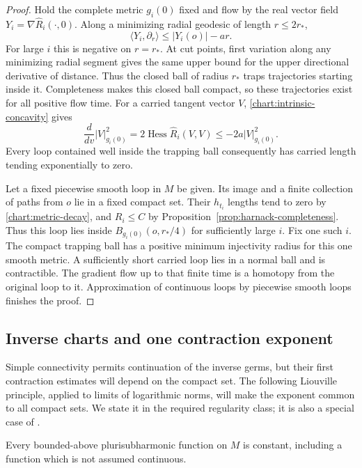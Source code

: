 \begin{proof}
Hold the complete metric $g_i(0)$ fixed and flow by the real
vector field $Y_i=\nabla\widehat R_i(\cdot,0)$.  Along a
minimizing radial geodesic of length $r\le2r_*$,
\[
 \langle Y_i,\partial_r\rangle
 \le |Y_i(o)|-ar.
\]
For large $i$ this is negative on $r=r_*$.  At cut points,
first variation along any minimizing radial segment gives the
same upper bound for the upper directional derivative of
distance.  Thus the closed ball of radius $r_*$ traps trajectories
starting inside it.  Completeness makes this closed ball compact,
so these trajectories exist for all positive flow time.
For a carried tangent vector $V$, \eqref{chart:intrinsic-concavity}
gives
\[
 \frac{d}{dv}|V|_{g_i(0)}^2
 =2\operatorname{Hess}\widehat R_i(V,V)
 \le-2a|V|_{g_i(0)}^2.
\]
Every loop contained well inside the trapping ball consequently
has carried length tending exponentially to zero.

Let a fixed piecewise smooth loop in $M$ be given.  Its image
and a finite collection of paths from $o$ lie in a fixed compact
set.  Their $h_{t_i}$ lengths tend to zero by
\eqref{chart:metric-decay}, and $R_i\le C$ by
Proposition~\ref{prop:harnack-completeness}.  Thus this loop
lies inside $B_{g_i(0)}(o,r_*/4)$ for sufficiently large $i$.
Fix one such $i$.  The compact trapping ball has a positive
minimum injectivity radius for this one smooth metric.  A
sufficiently short carried loop lies in a normal ball and is
contractible.  The gradient flow up to that finite time is a
homotopy from the original loop to it.  Approximation of
continuous loops by piecewise smooth loops finishes the proof.
\end{proof}

\subsection{Inverse charts and one contraction exponent}

Simple connectivity permits continuation of the inverse germs, but
their first contraction estimates will depend on the compact set.
The following Liouville principle, applied to limits of logarithmic
norms, will make the exponent common to all compact sets.  We state it
in the required regularity class; it is also a special case of
\cite[Theorem~9]{LiuThreeCircle}.

\begin{lemma}\label{chart:psh-liouville}
Every bounded-above plurisubharmonic function on $M$ is constant,
including a function which is not assumed continuous.
\end{lemma}


